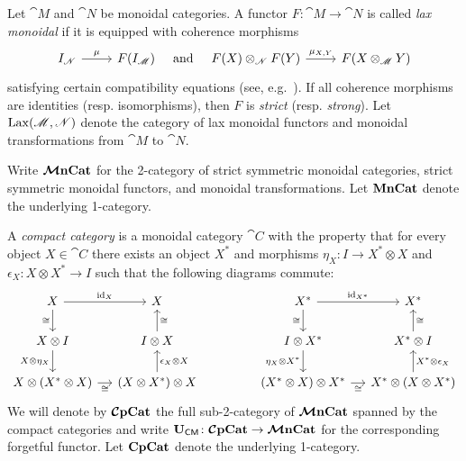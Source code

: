\documentclass[11pt,oneside,article]{memoir}
\begin{document}
Let $\cat{M}$ and $\cat{N}$ be monoidal categories. A functor $F\colon\cat{M}\to\cat{N}$ is called \emph{lax monoidal} if it is equipped with coherence morphisms
\begin{equation*} \begin{tikzcd}
      I_{\cat{N}} \rar{\mu} & F(I_{\cat{M}})
\end{tikzcd}
\quad\text{and}\quad 
\begin{tikzcd}
      F(X) \otimes_{\cat{N}} F(Y) \rar{\mu_{X,Y}} & F(X\otimes_{\cat{M}} Y)
\end{tikzcd} \end{equation*}
satisfying certain compatibility equations (see, e.g.\ \cite{Leinster,BorceuxV2}).  If all coherence morphisms are identities (resp. isomorphisms), then $F$ is \emph{strict} (resp. \emph{strong}).  Let $\operatorname{Lax}(\mathscr{M},\mathscr{N})$ denote the category of lax monoidal functors and monoidal transformations from $\cat{M}$ to $\cat{N}$.

Write $\bm{\mathcal{M}}\mathbf{nCat}$ for the 2-category of strict symmetric monoidal categories, strict symmetric
monoidal functors, and monoidal transformations.  Let $\mathbf{MnCat}$ denote the underlying 1-category.

A \emph{compact category} is a monoidal category $\cat{C}$ with the property that for every
object $X\in\cat{C}$ there exists an object $X^*$ and morphisms $\eta_X\colon I\to X^*\otimes X$ and
$\epsilon_X\colon X\otimes X^*\to I$ such that the following diagrams commute:
\begin{equation*}
   \begin{tikzcd}[column sep=small]
      X\arrow[r,"\id_X"]\arrow[d,"\cong"'] & X \\
      X\otimes I\arrow[d,"X\otimes\eta_X"'] & I\otimes X\arrow[u,"\cong"'] \\
      X\otimes(X^*\otimes X)\arrow[r,"\cong"'] & (X\otimes X^*)\otimes X\arrow[u,"\epsilon_X\otimes X"']
   \end{tikzcd}
   \hspace{.6in}
   \begin{tikzcd}[column sep=small]
      X^*\arrow[r,"\id_{X^*}"]\arrow[d,"\cong"'] & X^*\\
      I\otimes X^*\arrow[d,"\eta_X\otimes X^*"'] & X^*\otimes I\arrow[u,"\cong"'] \\
      (X^*\otimes X)\otimes X^*\arrow[r,"\cong"'] & X^*\otimes (X\otimes X^*)\arrow[u,"X^*\otimes\epsilon_X"']
   \end{tikzcd}
\end{equation*}
We will denote by $\bm{\mathcal{C}}\mathbf{pCat}$ the full sub-2-category of $\bm{\mathcal{M}}\mathbf{nCat}$ spanned by the compact categories and write $\mathbf{U}_{\mathsf{CM}}\colon\bm{\mathcal{C}}\mathbf{pCat}\to\bm{\mathcal{M}}\mathbf{nCat}$ for the corresponding forgetful functor.  Let $\mathbf{CpCat}$ denote the underlying 1-category.
\end{document}
